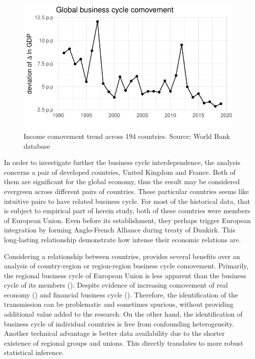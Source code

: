 \documentclass{article}
\begin{document}
\begin{figure}[h]
  \centering
  \includegraphics[scale=0.8]{graphs/globalization.pdf}
  \caption{Income comovement trend across 194 countries. Source: World Bank database}
\end{figure}

In order to investigate further the business cycle interdependence, the analysis concerns a pair of developed countries, United Kingdom and France. Both of them are significant for the global economy, thus the result may be considered evergreen across different pairs of countries. These particular countries seems like intuitive pairs to have related business cycle. For most of the historical data, that is subject to empirical part of herein study, both of these countries were members of European Union. Even before its establishment, they perhaps trigger European integration by forming Anglo-French Alliance during treaty of Dunkirk. This long-lasting relationship demonstrate how intense their economic relations are.

Considering a relationship between countries, provides several benefits over an analysis of country-region or region-region business cycle comovement. Primarily, the regional business cycle of European Union is less apparent than the business cycle of its members (\cite{grigoras}). Despite evidence of increasing comovement of real economy (\cite{gogas}) and financial business cycle (\cite{savona}). Therefore, the identification of the transmission can be problematic and sometimes spurious, without providing additional value added to the research. On the other hand, the identification of business cycle of individual countries is free from confounding heterogeneity. Another technical advantage is better data availability due to the shorter existence of regional groups and unions. This directly translates to more robust statistical inference. 
\end{document}
